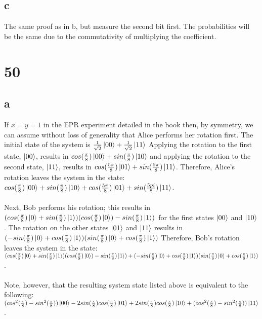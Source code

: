 \documentclass[letterpaper,notitlepage,twoside]{article}
\begin{document}
\subsection*{c}
The same proof as in b, but measure the second bit first. The probabilities will be the same due to the commutativity of multiplying the coefficient.\\
\section*{50}
\subsection*{a}
If $x=y=1$ in the EPR experiment detailed in the book then, by symmetry, we can assume without loss of generality that Alice performs her rotation first. The initial state of the system is $\frac{1}{\sqrt{2}} \ket{00} + \frac{1}{\sqrt{2}} \ket{11}$ Applying the rotation to the first state, $\ket{00}$, results in $cos(\frac{\pi}{8}) \ket{00} + sin(\frac{\pi}{8}) \ket{10}$ and applying the rotation to the second state, $\ket{11}$, results in $cos(\frac{5\pi}{8}) \ket{01} + sin(\frac{5\pi}{8}) \ket{11}$. Therefore, Alice's rotation leaves the system in the state: $cos(\frac{\pi}{8}) \ket{00} + sin(\frac{\pi}{8}) \ket{10} + cos(\frac{5\pi}{8}) \ket{01} + sin(\frac{5pi}{8}) \ket{11}$. \\\\
Next, Bob performs his rotation; this results in $(cos(\frac{\pi}{8}) \ket{0} + sin(\frac{\pi}{8}) \ket{1})(cos(\frac{\pi}{8}) \ket{0}) - sin(\frac{\pi}{8})\ket{1})$ for the first states $\ket{00}$ and $\ket{10}$. The rotation on the other states $\ket{01}$ and $\ket{11}$ results in $(-sin(\frac{\pi}{8}) \ket{0} + cos(\frac{\pi}{8}) \ket{1})(sin(\frac{\pi}{8}) \ket{0} + cos(\frac{\pi}{8}) \ket{1})$
Therefore, Bob's rotation leaves the system in the state: \\
 $(cos(\frac{\pi}{8}) \ket{0} + sin(\frac{\pi}{8}) \ket{1})(cos(\frac{\pi}{8}) \ket{0}) - sin(\frac{\pi}{8})\ket{1}) + (-sin(\frac{\pi}{8}) \ket{0} + cos(\frac{\pi}{8}) \ket{1})(sin(\frac{\pi}{8}) \ket{0} + cos(\frac{\pi}{8}) \ket{1})$. \\\\
Note, however, that the resulting system state listed above is equivalent to the following: $(cos^{2}(\frac{\pi}{8}) - sin^{2}(\frac{\pi}{8})) \ket{00} - 2sin(\frac{\pi}{8})cos(\frac{\pi}{8}) \ket{01} + 2sin(\frac{\pi}{8})cos(\frac{\pi}{8}) \ket{10} + (cos^{2}(\frac{\pi}{8}) - sin^{2}(\frac{\pi}{8})) \ket{11}$.\\
\end{document}
